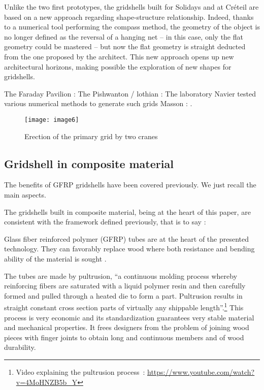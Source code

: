 Unlike the two first prototypes, the gridshells built for Solidays and at Créteil are based on a new approach regarding shape-structure relationship. Indeed, thanks to a numerical tool performing the compass method, the geometry of the object is no longer defined as the reversal of a hanging net – in this case, only the flat geometry could be mastered \cite{Addis2013} – but now the flat geometry is straight deducted from the one proposed by the architect.
This new approach opens up new architectural horizons, making possible the exploration of new shapes for gridshells.

The Faraday Pavilion : \cite{Nicholas2013}
The Pishwanton / lothian : \cite{Pishwanton2003}
The laboratory Navier tested various numerical methods to generate such grids \cite{Bouhaya2009}
Masson :  \cite{Masson2017}.
\begin{figure}[t]
	\centering
		\texttt{[image: image6]}
	\caption{Erection of the primary grid by two cranes}
	\label{fig:5}
\end{figure}



\subsection{Gridshell in composite material}

The benefits of GFRP gridshells have been covered previously. We just recall the main aspects.

The gridshells built in composite material, being at the heart of this paper, are consistent with the framework defined previously, that is to say :


Glass fiber reinforced polymer (GFRP) tubes are at the heart of the presented technology. They can favorably replace wood where both resistance and bending ability of the material is sought \cite{Douthe2010}. 

The tubes are made by pultrusion, \enquote{a continuous molding process whereby reinforcing fibers are saturated with a liquid polymer resin and then carefully formed and pulled through a heated die to form a part. Pultrusion results in straight constant cross section parts of virtually any shippable length}.\footnote{Video explaining the pultrusion process~: \url{https://www.youtube.com/watch?v=4MoHNZB5b_Y}} This process is very economic and its standardization guarantees very stable material and mechanical properties. It frees designers from the problem of joining wood pieces with finger joints to obtain long and continuous members and of wood durability. 


